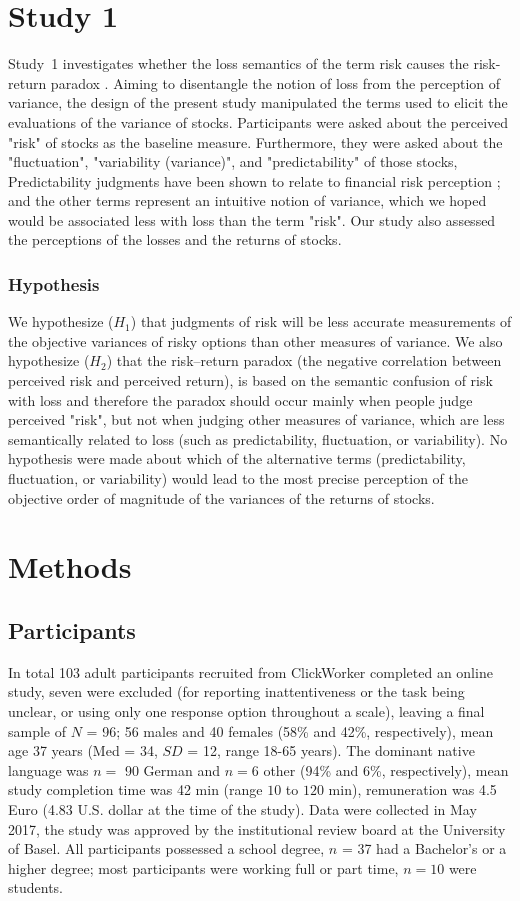 \documentclass[a4paper,man, natbib,floatsintext]{apa6} %
\begin{document}
\section{Study 1}
Study~1 investigates whether the loss semantics of the term risk causes the risk-return paradox . Aiming to disentangle the notion of loss from the perception of variance, the design of the present study manipulated the terms used to elicit the evaluations of the variance of stocks. Participants were asked about the perceived "risk" of stocks as the baseline measure. Furthermore, they were asked about the "fluctuation", "variability (variance)", and "predictability" of those stocks, Predictability judgments have been shown to relate to financial risk perception \citep{Sachse2012}; and the other terms represent an intuitive notion of variance, which we hoped would be associated less with loss than the term "risk". Our study also assessed the perceptions of the losses and the returns of stocks.


\subsubsection{Hypothesis}
We hypothesize ($H_1$) that judgments of risk will be less accurate measurements of the objective variances of risky options than other measures of variance. We also hypothesize ($H_2$) that the risk--return paradox (the negative correlation between perceived risk and perceived return), is based on the semantic confusion of risk with loss and therefore the paradox should occur mainly when people judge perceived "risk", but not when judging other measures of variance, which are less semantically related to loss (such as predictability, fluctuation, or variability). No hypothesis were made about which of the alternative terms (predictability, fluctuation, or variability) would lead to the most precise perception of the objective order of magnitude of the variances of the returns of stocks.

\section{Methods}
\subsection{Participants}
In total 103 adult participants recruited from ClickWorker completed an online study, seven were excluded (for reporting inattentiveness or the task being unclear, or using only one response option throughout a scale), leaving a final sample of $N$ = 96; 56 males and 40 females (58\% and 42\%, respectively), mean age 37 years (Med = 34, $SD$ = 12, range 18-65 years). The dominant native language was $n =$ 90 German and $n=6$ other (94\% and 6\%, respectively), mean study completion time was 42 min (range $10$ to $120$ min), remuneration was 4.5 Euro (4.83 U.S. dollar at the time of the study). Data were collected in May 2017, the study was approved by the institutional review board at the University of Basel. All participants possessed a school degree, $n$ = 37 had a Bachelor’s or a higher degree; most participants were working full or part time, $n=10$ were students.
\end{document}
